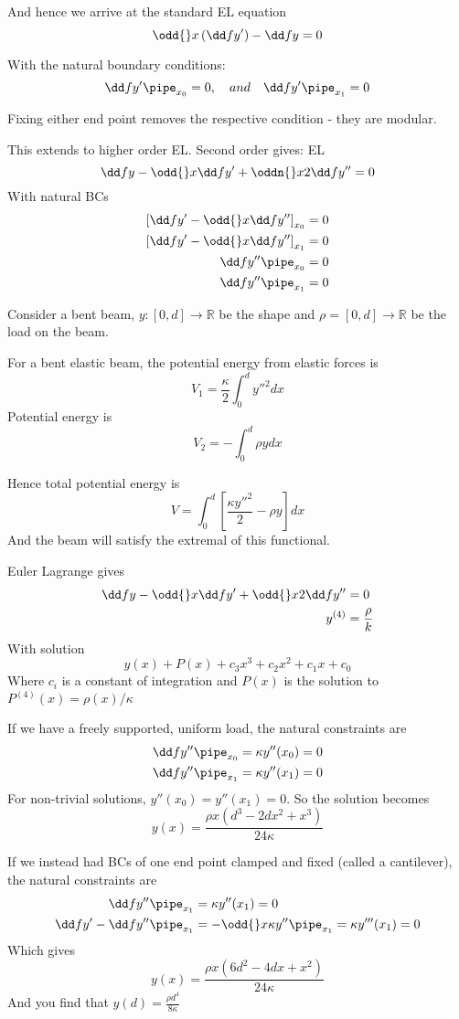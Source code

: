 \documentclass{X:/Documents/Coding/Latex/myassignment}
\begin{document}
And hence we arrive at the standard EL equation
\[\odd{}x \left(\dd f{y'}\right) - \dd fy = 0\]

With the natural boundary conditions:
\[\dd f{y'}\pipe_{x_0} = 0, \quad and \quad \dd f{y'}\pipe_{x_1} = 0\]

Fixing either end point removes the respective condition - they are modular.


This extends to higher order EL. Second order gives:
EL
\[\dd fy - \odd{}x \dd f{y'} + \oddn{}x2 \dd fy{''} = 0\]
With natural BCs
\begin{align*}
	\left[\dd f{y'} - \odd{}x \dd f{y''}\right]_{x_0} = 0\\
	\left[\dd f{y'} - \odd{}x \dd f{y''}\right]_{x_1} = 0\\
	\dd f{y''}\pipe_{x_0} =0\\
	\dd f{y''}\pipe_{x_1} =0 
\end{align*}


Consider a bent beam, $y : [0,d] \to \mathbb{R}$ be the shape and $\rho = [0,d] \to \mathbb{R}$ be the load on the beam.

For a bent elastic beam, the potential energy from elastic forces is
\[V_1 = \frac \kappa 2 \int_0^d y''^2 dx\]
Potential energy is
\[V_2 = -\int_0^d \rho y dx\]

Hence total potential energy is
\[V = \int_0^d \left[\frac{\kappa y''^2}{2} - \rho y\right] dx\]
And the beam will satisfy the extremal of this functional.

Euler Lagrange gives
\begin{align*}
	\dd fy - \odd{}x \dd f{y'} + \odd{}x2 \dd f{y''} &=0\\
	y^{(4)} &= \frac{\rho}{k}
\end{align*}
With solution
\[y(x) + P(x) + c_3 x^3 + c_2x^2 + c_1 x + c_0\]
Where $c_i$ is a constant of integration and $P(x)$ is the solution to $P^{(4)}(x) = \rho(x)/\kappa$

If we have a freely supported, uniform load, the natural constraints are
\begin{align*}
	\dd f{y''}\pipe_{x_0} &= \kappa y''(x_0) = 0\\
	\dd f{y''}\pipe_{x_1} &= \kappa y''(x_1) = 0\\
\end{align*}
For non-trivial solutions, $y''(x_0) = y''(x_1) = 0$.
So the solution becomes
\[y(x) = \frac{\rho x \left(d^3 - 2dx^2 + x^3\right)}{24 \kappa}\]


If we instead had BCs of one end point clamped and fixed (called a cantilever), the natural constraints are
\begin{align*}
	\dd f{y''}\pipe_{x_1} &= \kappa y''(x_1) = 0\\
	\dd f{y'} - \dd f{y''}\pipe_{x_1} &= - \odd{}x \kappa y'' \pipe_{x_1} = \kappa y'''(x_1) = 0\\
\end{align*}
Which gives
\[y(x) = \frac{\rho x (6 d^2 - 4dx + x^2)}{24 \kappa}\]
And you find that $y(d) = \frac{\rho d^4}{8 \kappa}$
\end{document}
